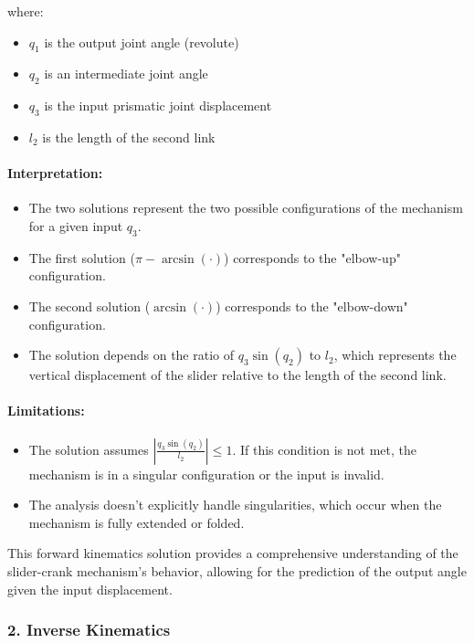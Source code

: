 \begin{solution}
where:
\begin{itemize}
    \item $q_1$ is the output joint angle (revolute)
    \item $q_2$ is an intermediate joint angle
    \item $q_3$ is the input prismatic joint displacement
    \item $l_2$ is the length of the second link
\end{itemize}

\paragraph{Interpretation:}
\begin{itemize}
    \item The two solutions represent the two possible configurations of the mechanism for a given input $q_3$.
    \item The first solution ($\pi - \arcsin(\cdot)$) corresponds to the "elbow-up" configuration.
    \item The second solution ($\arcsin(\cdot)$) corresponds to the "elbow-down" configuration.
    \item The solution depends on the ratio of $q_3 \sin(q_2)$ to $l_2$, which represents the vertical displacement of the slider relative to the length of the second link.
\end{itemize}

\paragraph{Limitations:}
\begin{itemize}
    \item The solution assumes $\left|\frac{q_3 \sin(q_2)}{l_2}\right| \leq 1$. If this condition is not met, the mechanism is in a singular configuration or the input is invalid.
    \item The analysis doesn't explicitly handle singularities, which occur when the mechanism is fully extended or folded.
\end{itemize}

This forward kinematics solution provides a comprehensive understanding of the slider-crank mechanism's behavior, allowing for the prediction of the output angle given the input displacement.
    
    \subsubsection*{2. Inverse Kinematics}
    

\end{solution}
